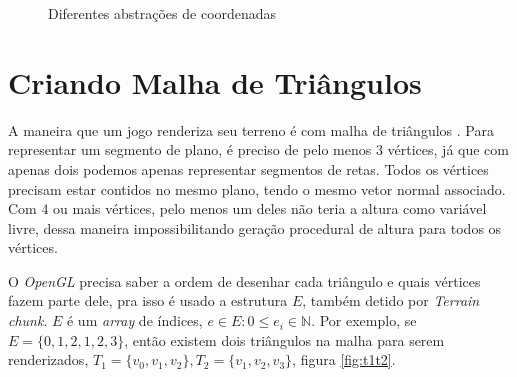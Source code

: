 \begin{figure}[H]
     \centering
     \hspace{0.1cm}
     \caption{Diferentes abstrações de coordenadas}
     \label{fig:coordenadasuahsuahs}
\end{figure}

\section{Criando Malha de Triângulos}
A maneira que um jogo renderiza seu terreno é com malha de triângulos \cite{dachsbacher2006interactive}.%
Para representar um segmento de plano, é preciso de pelo menos $3$ vértices, 
já que com apenas dois podemos apenas representar segmentos de retas. Todos os 
vértices precisam estar contidos no mesmo plano, tendo o mesmo vetor normal associado. Com $4$ ou mais vértices,
pelo menos um deles não teria a altura como variável livre, dessa maneira impossibilitando geração procedural de altura para todos os vértices.

O \textit{OpenGL} precisa saber a ordem de desenhar cada triângulo e quais vértices fazem parte dele, 
pra isso é usado a estrutura $E$, também detido por \textit{Terrain chunk}. 
$E$ é um \textit{array} de índices, $e \in E: 0 \leq e_{i} \in \mathbb{N}$. Por exemplo, se $E = \{ 0, 1, 2, 1, 2, 3\}$,
então existem dois triângulos na malha para serem renderizados, $T_{1} = \{ v_{0}, v_{1}, v_{2}\}, T_{2} = \{ v_{1}, v_{2}, v_{3}\}$, figura \ref{fig:t1t2}.

